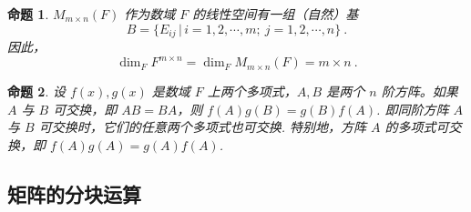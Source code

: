\documentclass[zihao=-4,UTF8,linespread=1.8,nothm]{aytony_base}
\newtheorem{proposition}{\indent 命题}[subsection]
\begin{document}
\begin{proposition}
    $M_{m \times n}(F)$ 作为数域 $F$ 的线性空间有一组（自然）基 $$
        B = \{E_{ij}\,|\, i = 1, 2, \cdots, m;\ j = 1, 2, \cdots, n\}\ .
    $$ 因此，$$
        \dim_FF^{m \times n} = \dim_FM_{m\times n}(F) = m \times n\ .
    $$
\end{proposition}

\begin{proposition}
    设 $f(x),g(x)$ 是数域 $F$ 上两个多项式，$A, B$ 是两个 $n$ 阶方阵。如果 $A$ 与 $B$ 可交换，即 $AB = BA$，则 $f(A)g(B) = g(B)f(A)$. 即同阶方阵 $A$ 与 $B$ 可交换时，它们的任意两个多项式也可交换. 特别地，方阵 $A$ 的多项式可交换，即 $f(A)g(A) = g(A)f(A)$.
\end{proposition}

\subsection{矩阵的分块运算}
\end{document}
